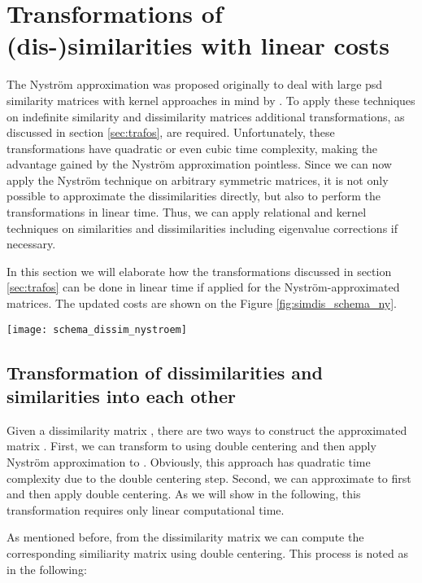 \documentclass[twoside,11pt]{article}
\begin{document}
\section{Transformations of (dis-)similarities with linear costs}
The Nystr\"om approximation was proposed originally
to deal with large psd similarity matrices
with kernel approaches in mind by \cite{DBLP:conf/nips/WilliamsS00}.
To apply these techniques on indefinite similarity and dissimilarity matrices
additional transformations, as discussed in section \ref{sec:trafos}, are required.
Unfortunately, these transformations have quadratic or even cubic time complexity,
making the advantage gained by the Nystr\"om approximation pointless.
Since we can now apply the Nystr\"om technique on arbitrary symmetric matrices,
it is not only possible to approximate the dissimilarities directly,
but also to perform the transformations in linear time.
Thus, we can apply relational and kernel techniques
on similarities and dissimilarities including eigenvalue corrections if necessary.

In this section we will elaborate
how the transformations discussed in section \ref{sec:trafos}
can be done in linear time if applied for the Nystr\"om-approximated matrices.
The updated costs are shown on the Figure \ref{fig:simdis_schema_ny}.

\begin{figure*}
\centering
	\texttt{[image: schema\_dissim\_nystroem]}
	\caption{Updated schema from Figure \ref{fig:simdis_schema}
	using the discussed approximation.
	The costs are now substantially smaller, provided .
	}
	 \label{fig:simdis_schema_ny}
\end{figure*}

\subsection{Transformation of dissimilarities and similarities into each other}
Given a dissimilarity matrix ,
there are two ways to construct the approximated matrix .
First, we can transform  to  using double centering
and then apply Nystr\"om approximation to .
Obviously, this approach has quadratic time complexity
due to the double centering step.
Second, we can approximate  to  first
and then apply double centering.
As we will show in the following,
this transformation requires only linear computational time.

As mentioned before, from the dissimilarity matrix 
we can compute the corresponding similiarity matrix using double centering.
This process is noted as   in the following:
\end{document}
